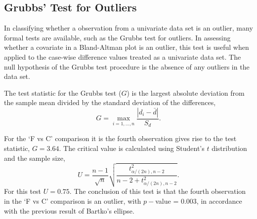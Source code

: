 \documentclass[12pt, a4paper]{report}
\theoremstyle{plain}
\theoremstyle{definition}
\theoremstyle{remark}
\begin{document}












\subsection{Grubbs' Test for Outliers}


In classifying whether a observation from a univariate data set is an outlier, many formal tests are available, such as the Grubbs test for outliers. In assessing whether a covariate in a Bland-Altman plot is an outlier, this test is useful when applied to the case-wise difference values treated as a univariate data set. The null hypothesis of the Grubbs test procedure is the absence of any outliers in the data set. 

The test statistic for the Grubbs test ($G$) is the largest absolute deviation from the sample mean divided by the standard
deviation of the differences,
\begin{equation}
G =  \displaystyle\max_{i=1,\ldots, n}\frac{\left \vert d_i -
	\bar{d}\right\vert}{S_{d}}.
\end{equation}

For the `F vs C' comparison it is the fourth observation gives rise to the test statistic, $G = 3.64$. The critical value is
calculated using Student's $t$ distribution and the sample size,
\[
U = \frac{n-1}{\sqrt{n}} \sqrt{\frac{t_{\alpha/(2n),n-2}^2}{n - 2
		+ t_{\alpha/(2n),n-2}^2}}.
\]
For this test $U = 0.75$. The conclusion of this test is that the fourth observation in the `F vs C' comparison is an outlier, with $p-$value = 0.003, in accordance with the previous result of Bartko's ellipse.


\end{document}

